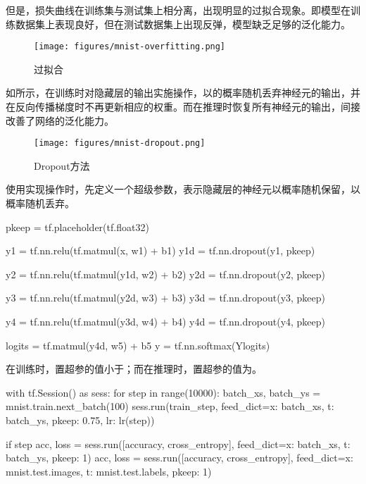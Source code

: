 \begin{content}
\begin{content}
但是，损失曲线在训练集与测试集上相分离，出现明显的过拟合现象。即模型在训练数据集上表现良好，但在测试数据集上出现反弹，模型缺乏足够的泛化能力。

\begin{figure}[H]
\centering
\texttt{[image: figures/mnist-overfitting.png]}
\caption{过拟合}
 \label{fig:mnist-overfitting}
\end{figure}

如所示，在训练时对隐藏层的输出实施操作，以的概率随机丢弃神经元的输出，并在反向传播梯度时不再更新相应的权重。而在推理时恢复所有神经元的输出，间接改善了网络的泛化能力。

\begin{figure}[H]
\centering
\texttt{[image: figures/mnist-dropout.png]}
\caption{Dropout方法}
 \label{fig:mnist-dropout}
\end{figure}

使用\tf{}实现操作时，先定义一个超级参数，表示隐藏层的神经元以概率随机保留，以概率随机丢弃。

\begin{leftbar}
\begin{python}
pkeep = tf.placeholder(tf.float32)

y1 = tf.nn.relu(tf.matmul(x,  w1) + b1)
y1d = tf.nn.dropout(y1, pkeep)

y2 = tf.nn.relu(tf.matmul(y1d, w2) + b2)
y2d = tf.nn.dropout(y2, pkeep)

y3 = tf.nn.relu(tf.matmul(y2d, w3) + b3)
y3d = tf.nn.dropout(y3, pkeep)

y4 = tf.nn.relu(tf.matmul(y3d, w4) + b4)
y4d = tf.nn.dropout(y4, pkeep)

logits = tf.matmul(y4d, w5) + b5
y = tf.nn.softmax(Ylogits)
\end{python}
\end{leftbar}

在训练时，置超参的值小于；而在推理时，置超参的值为。

\begin{leftbar}
\begin{python}
with tf.Session() as sess:
  for step in range(10000):
    batch_xs, batch_ys = mnist.train.next_batch(100)
    sess.run(train_step, 
      feed_dict={x: batch_xs, t: batch_ys, pkeep: 0.75, lr: lr(step)})

    if step %
      acc, loss = sess.run([accuracy, cross_entropy], 
        feed_dict={x: batch_xs, t: batch_ys, pkeep: 1})
      acc, loss = sess.run([accuracy, cross_entropy], 
        feed_dict={x: mnist.test.images, t: mnist.test.labels, pkeep: 1})
\end{python}
\end{leftbar}


\end{content}
\end{content}

